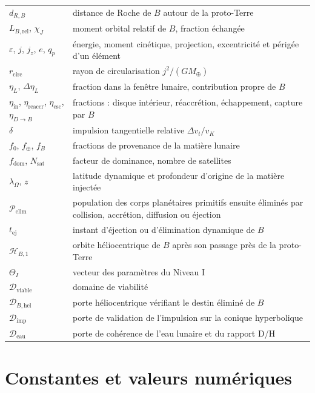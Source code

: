 \documentclass[11pt,a4paper,openany]{report}
\newcommand{\Mt}{M_{\oplus}}
\begin{document}
\begin{longtable}{>{\raggedright\arraybackslash}p{3.2cm}>{\raggedright\arraybackslash}p{11.6cm}}
$d_{R,B}$ & distance de Roche de $B$ autour de la proto-Terre \\
$L_{B,\mathrm{rel}}$, $\chi_J$ & moment orbital relatif de $B$, fraction échangée \\
$\varepsilon$, $j$, $j_z$, $e$, $q_p$ & énergie, moment cinétique, projection, excentricité et périgée d'un élément \\
$r_{\mathrm{circ}}$ & rayon de circularisation $j^2/(G\Mt)$ \\
$\eta_L$, $\Delta\eta_L$ & fraction dans la fenêtre lunaire, contribution propre de $B$ \\
$\eta_{\mathrm{in}}$, $\eta_{\mathrm{reaccr}}$, $\eta_{\mathrm{esc}}$, $\eta_{D\to B}$ & fractions : disque intérieur, réaccrétion, échappement, capture par $B$ \\
$\delta$ & impulsion tangentielle relative $\Delta v_t/v_K$ \\
$f_0$, $f_\oplus$, $f_B$ & fractions de provenance de la matière lunaire \\
$f_{\mathrm{dom}}$, $N_{\mathrm{sat}}$ & facteur de dominance, nombre de satellites \\
$\lambda_\Omega$, $z$ & latitude dynamique et profondeur d'origine de la matière injectée \\
$\mathcal{P}_{\mathrm{elim}}$ & population des corps planétaires primitifs ensuite éliminés par collision, accrétion, diffusion ou éjection \\
$t_{\mathrm{ej}}$ & instant d'éjection ou d'élimination dynamique de $B$ \\
$\mathcal{H}_{B,1}$ & orbite héliocentrique de $B$ après son passage près de la proto-Terre \\
$\Theta_I$ & vecteur des paramètres du Niveau I \\
$\mathcal{D}_{\mathrm{viable}}$ & domaine de viabilité \\
$\mathcal{D}_{B,\mathrm{hel}}$ & porte héliocentrique vérifiant le destin éliminé de $B$ \\
$\mathcal{D}_{\mathrm{imp}}$ & porte de validation de l'impulsion sur la conique hyperbolique \\
$\mathcal{D}_{\mathrm{eau}}$ & porte de cohérence de l'eau lunaire et du rapport D/H \\
\bottomrule
\end{longtable}
\normalsize

\chapter{Constantes et valeurs numériques}
\label{app:constantes}
\end{document}
